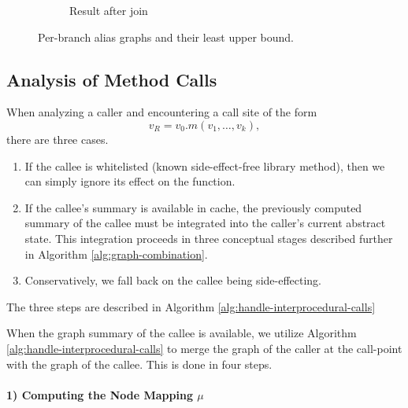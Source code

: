 \documentclass{article}
\begin{document}
\begin{figure}[ht]
\begin{subfigure}{0.32\textwidth}
\caption{Result after join} \label{alias}
\end{subfigure}

\caption{Per-branch alias graphs and their least upper bound.}
\label{fig:lub-graphs}
\end{figure}


\subsection{Analysis of Method Calls}\label{sec:method-call}

When analyzing a caller and encountering a call site of the form
\[
v_R = v_0.m(v_1,\dots,v_k),
\] there are three cases. 

\begin{enumerate}
    \item If the callee is whitelisted (known side-effect-free library method), then we can simply ignore its effect on the function.
    \item If the callee's summary is available in cache, the previously computed summary of the callee must be integrated into the caller’s current abstract state. This integration proceeds in three conceptual stages described further in Algorithm \ref{alg:graph-combination}.
    \item Conservatively, we fall back on the callee being side-effecting.
\end{enumerate}

The three steps are described in Algorithm \ref{alg:handle-interprocedural-calls}

 
 

 
When the graph summary of the callee is available, we utilize Algorithm \ref{alg:handle-interprocedural-calls} to merge the graph of the caller at the call-point with the graph of the callee. This is done in four steps. 

\paragraph{1) Computing the Node Mapping $\mu$}
\end{document}
